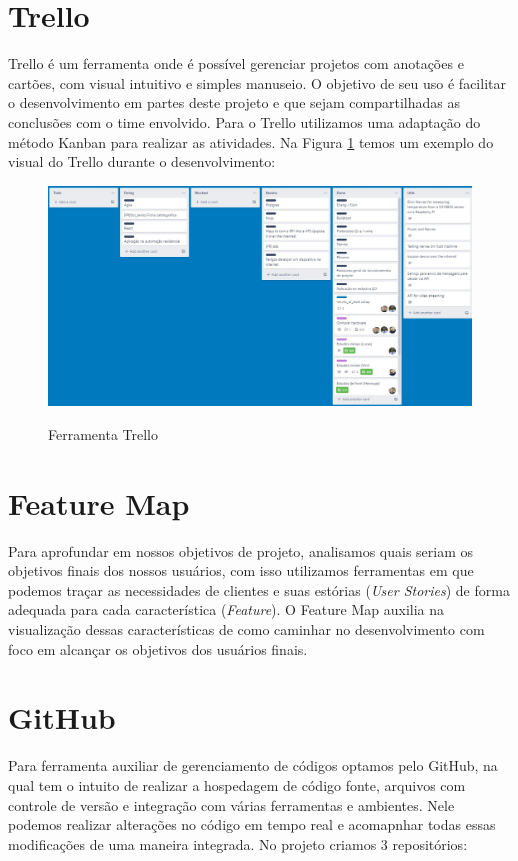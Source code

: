 \documentclass[../../layout.tex]{subfiles}
\begin{document}
\section{Trello}
\hspace*{3em}Trello é um ferramenta onde é possível gerenciar projetos com anotações e cartões, com visual intuitivo e simples manuseio. O objetivo de seu uso é facilitar o desenvolvimento em partes deste projeto e que sejam compartilhadas as conclusões com o time envolvido. Para o Trello utilizamos uma adaptação do método Kanban para realizar as atividades. Na Figura \ref{fig:trello} temos um exemplo do visual do Trello durante o desenvolvimento:

\begin{figure}[H]
\centering
\caption{Ferramenta Trello}
\includegraphics[width=1\textwidth]{assets/static/img/trello.jpg}
\label{fig:trello}
\begin{minipage}{0.5\textwidth} 
\end{minipage}
\end{figure}

\section{Feature Map}
\hspace*{3em}Para aprofundar em nossos objetivos de projeto, analisamos quais seriam os objetivos finais dos nossos usuários, com isso utilizamos ferramentas em que podemos traçar as necessidades de clientes e suas estórias (\emph{User Stories}) de forma adequada para cada característica (\emph{Feature}). O Feature Map auxilia na visualização dessas características de como caminhar no desenvolvimento com foco em alcançar os objetivos dos usuários finais.

\section{GitHub}
\hspace*{3em}Para ferramenta auxiliar de gerenciamento de códigos optamos pelo GitHub, na qual tem o intuito de realizar a hospedagem de código fonte, arquivos com controle de versão e integração com várias ferramentas e ambientes. Nele podemos realizar alterações no código em tempo real e acomapnhar todas essas modificações de uma maneira integrada. No projeto criamos 3 repositórios:
\end{document}
